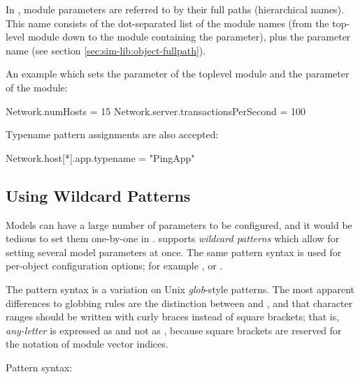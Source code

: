 In , module parameters are referred to by their full paths
(hierarchical names). This name consists of the dot-separated list of
the module names (from the top-level module down to the module containing
the parameter), plus the parameter name (see section \ref{sec:sim-lib:object-fullpath}).

An example  which sets the  parameter of
the toplevel module and the  parameter of the
 module:

\begin{inifile}
[General]
Network.numHosts = 15
Network.server.transactionsPerSecond = 100
\end{inifile}

Typename pattern assignments are also accepted:

\begin{inifile}
[General]
Network.host[*].app.typename = "PingApp"
\end{inifile}


\subsection{Using Wildcard Patterns}
\label{sec:config-sim:wildcards}

Models can have a large number of parameters to be configured, and it would
be tedious to set them one-by-one in . {\opp} supports
\textit{wildcard patterns} which allow for setting several model parameters
at once. The same pattern syntax is used for per-object configuration options;
for example , or .

The pattern syntax is a variation on Unix \textit{glob}-style
patterns. The most apparent differences to globbing rules are the
distinction between \ttt{*} and \ttt{**}, and that character ranges should
be written with curly braces instead of square brackets; that is,
\textit{any-letter} is expressed as  and not as
\ttt{[a-zA-Z]}, because square brackets are reserved for the notation of
module vector indices.

Pattern syntax:


